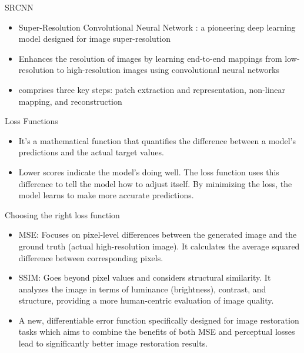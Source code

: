 \documentclass{beamer}
\begin{document}
\begin{frame}{SRCNN}
  \begin{itemize}
    \item Super-Resolution Convolutional Neural Network : a pioneering deep learning model designed for image super-resolution 
    \item Enhances the resolution of images by learning end-to-end mappings from low-resolution to high-resolution images using convolutional neural networks 
    \item comprises three key steps: patch extraction and representation, non-linear mapping, and reconstruction
    
  \end{itemize}
\end{frame}
\begin{frame}{Loss Functions}
  \begin{itemize}
    \item It's a mathematical function that quantifies the difference between a model's predictions and the actual target values.
    \item Lower scores indicate the model's doing well. The loss function uses this difference to tell the model how to adjust itself. By minimizing the loss, the model learns to make more accurate predictions.
    
    
    
  \end{itemize}
\end{frame}
\begin{frame}{Choosing the right loss function}
  \begin{itemize}
    \item MSE: Focuses on pixel-level differences between the generated image and the ground truth (actual high-resolution image). It calculates the average squared difference between corresponding pixels.
    \item SSIM: Goes beyond pixel values and considers structural similarity. It analyzes the image in terms of luminance (brightness), contrast, and structure, providing a more human-centric evaluation of image quality.
    \item A new, differentiable error function specifically designed for image restoration tasks which aims to combine the benefits of both MSE and perceptual losses lead to significantly better image restoration results.
    
    
    
  \end{itemize}
\end{frame}
\end{document}
